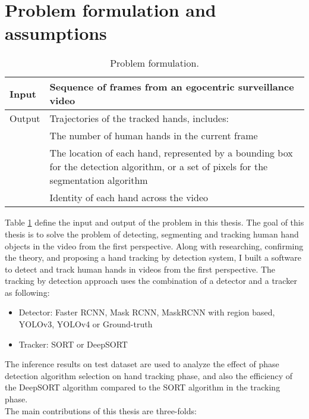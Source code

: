 \section{Problem formulation and assumptions}
\begin{table}
	\caption{Problem formulation.}
	\label{formulation}
	\begin{tabular}{|l|p{13cm}|}
		
		\hline 
		Input &  Sequence of frames from an egocentric surveillance video\\ 
		\hline 
		Output & Trajectories of the tracked hands, includes: \\
		& \tabitem The number of human hands in the current frame \\
		& \tabitem The location of each hand, represented by a bounding box for the detection algorithm, or a set of pixels for the segmentation algorithm \\
		& \tabitem Identity of each hand across the video
\\ 
		\hline 
	\end{tabular} 
\end{table}
Table \ref{formulation} define the input and output of the problem in this thesis. The goal of this thesis is to solve the problem of detecting, segmenting and tracking human hand objects in the video from the first perspective. Along with researching, confirming the theory, and proposing a hand tracking by detection system, I built a software to detect and track human hands in videos from the first perspective. The tracking by detection approach uses the combination of a detector and a tracker as following:
\begin{itemize}
	\item Detector: Faster RCNN, Mask RCNN, MaskRCNN with region based, YOLOv3, YOLOv4 or Ground-truth
	\item Tracker: SORT or DeepSORT
\end{itemize}
The inference results on test dataset are used to analyze the effect of phase detection algorithm selection on hand tracking phase, and also the efficiency of the DeepSORT algorithm compared to the SORT algorithm in the tracking phase.
\\The main contributions of this thesis are three-folds:

